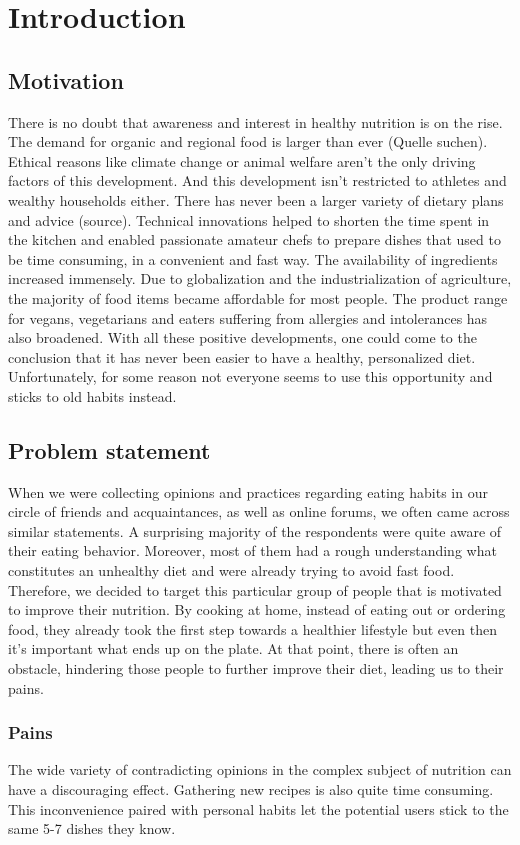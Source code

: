 \chapter{Introduction}
\section{Motivation}
There is no doubt that awareness and interest in healthy nutrition is on the rise. The demand for organic and regional food is larger than ever (Quelle suchen). Ethical reasons like climate change or animal welfare aren’t the only driving factors of this development. And this development isn’t restricted to athletes and wealthy households either. There has never been a larger variety of dietary plans and advice (source). Technical innovations helped to shorten the time spent in the kitchen and enabled passionate amateur chefs to prepare dishes that used to be time consuming, in a convenient and fast way. The availability of ingredients increased immensely. Due to globalization and the industrialization of agriculture, the majority of food items became affordable for most people. The product range for vegans, vegetarians and eaters suffering from allergies and intolerances has also broadened. With all these positive developments, one could come to the conclusion that it has never been easier to have a healthy, personalized diet. Unfortunately, for some reason not everyone seems to use this opportunity and sticks to old habits instead.
\section{Problem statement}
When we were collecting opinions and practices regarding eating habits in our circle of friends and acquaintances, as well as online forums, we often came across similar statements. A surprising majority of the respondents were quite aware of their eating behavior. Moreover, most of them had a rough understanding what constitutes an unhealthy diet and were already trying to avoid fast food. Therefore, we decided to target this particular group of people that is motivated to improve their nutrition. By cooking at home, instead of eating out or ordering food, they already took the first step towards a healthier lifestyle but even then it’s important what ends up on the plate. At that point, there is often an obstacle, hindering those people to further improve their diet, leading us to their  pains.

\subsection*{Pains}
The wide variety of contradicting opinions in the complex subject of nutrition can have a discouraging effect. Gathering new recipes is also quite time consuming. This inconvenience paired with personal habits let the potential users stick to the same 5-7 dishes they know.


